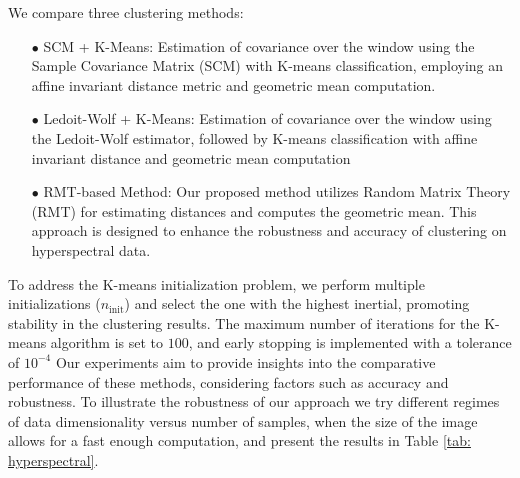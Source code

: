 \documentclass{article}
\theoremstyle{plain}
\theoremstyle{definition}
\theoremstyle{remark}
\begin{document}
We compare three clustering methods:
\begin{itemize}
    \item[$\bullet$] SCM + K-Means: Estimation of covariance over the window using the Sample Covariance Matrix (SCM) with K-means classification, employing an affine invariant distance metric and geometric mean computation.
    \item[$\bullet$] Ledoit-Wolf + K-Means: Estimation of covariance over the window using the Ledoit-Wolf estimator, followed by K-means classification with affine invariant distance and geometric mean computation
    \item[$\bullet$] RMT-based Method: Our proposed method utilizes Random Matrix Theory (RMT) for estimating distances and computes the geometric mean. This approach is designed to enhance the robustness and accuracy of clustering on hyperspectral data.
\end{itemize}

To address the K-means initialization problem, we perform multiple initializations ($n_{\mathrm{init}}$) and select the one with the highest inertial, promoting stability in the clustering results. The maximum number of iterations for the K-means algorithm is set to $100$, and early stopping is implemented with a tolerance of $10^{-4}$
Our experiments aim to provide insights into the comparative performance of these methods, considering factors such as accuracy and robustness. To illustrate the robustness of our approach we try different regimes of data dimensionality versus number of samples, when the size of the image allows for a fast enough computation, and present the results in Table \ref{tab: hyperspectral}.






\newpage
\appendix
\onecolumn





\end{document}
